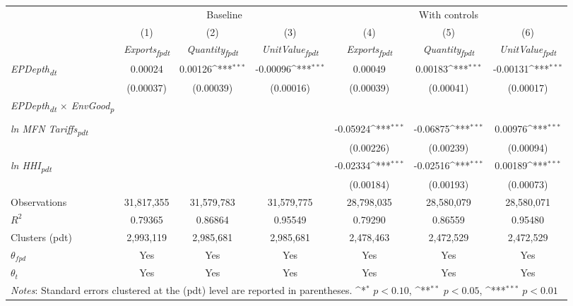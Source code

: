 {
\def\sym#1{\ifmmode^{#1}\else\(^{#1}\)\fi}
\begin{tabular}{l*{6}{c}}
\toprule
&\multicolumn{3}{c}{Baseline}&\multicolumn{3}{c}{With controls}\\\cmidrule(lr){2-4}\cmidrule(lr){5-7}
&(1)&(2)&(3)&(4)&(5)&(6)\\
&\textit{Exports\textsubscript{fpdt}}&\textit{Quantity\textsubscript{fpdt}}&\textit{UnitValue\textsubscript{fpdt}}&\textit{Exports\textsubscript{fpdt}}&\textit{Quantity\textsubscript{fpdt}}&\textit{UnitValue\textsubscript{fpdt}}\\
\midrule
\textit{EPDepth\textsubscript{dt}} & 0.00024 & 0.00126\sym{***} & -0.00096\sym{***} & 0.00049 & 0.00183\sym{***} & -0.00131\sym{***}\\
 & (0.00037) & (0.00039) & (0.00016) & (0.00039) & (0.00041) & (0.00017)\\
\addlinespace
\textit{EPDepth\textsubscript{dt} $\times$ EnvGood\textsubscript{p}} &  &  &  &  &  & \\
 &  &  &  &  &  & \\
\addlinespace
\textit{ln MFN Tariffs\textsubscript{pdt}} &  &  &  & -0.05924\sym{***} & -0.06875\sym{***} & 0.00976\sym{***}\\
 &  &  &  & (0.00226) & (0.00239) & (0.00094)\\
\addlinespace
\textit{ln HHI\textsubscript{pdt}} &  &  &  & -0.02334\sym{***} & -0.02516\sym{***} & 0.00189\sym{***}\\
 &  &  &  & (0.00184) & (0.00193) & (0.00073)\\
\midrule
Observations & 31,817,355 & 31,579,783 & 31,579,775 & 28,798,035 & 28,580,079 & 28,580,071\\
$R^{2}$ & 0.79365 & 0.86864 & 0.95549 & 0.79290 & 0.86559 & 0.95480\\
Clusters (pdt) & 2,993,119 & 2,985,681 & 2,985,681 & 2,478,463 & 2,472,529 & 2,472,529\\
$\theta_{fpd}$ & Yes & Yes & Yes & Yes & Yes & Yes\\
$\theta_{t}$ & Yes & Yes & Yes & Yes & Yes & Yes\\
\bottomrule
\multicolumn{7}{l}{\footnotesize \textit{Notes}: Standard errors clustered at the (pdt) level are reported in parentheses. \sym{*} \(p<0.10\), \sym{**} \(p<0.05\), \sym{***} \(p<0.01\)}\\
\end{tabular}
}
